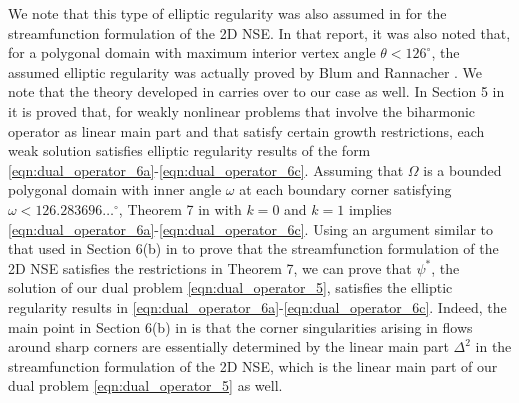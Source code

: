 \begin{remark}
  We note that this type of elliptic regularity was also assumed in \cite{Cayco86}
  for the streamfunction formulation of the 2D NSE.  In that report, it was also
  noted that, for a polygonal domain with maximum interior vertex angle $\theta <
  126^{\circ}$, the assumed elliptic regularity was actually proved by Blum and
  Rannacher \cite{Blum1980}.  We note that the theory developed in
  \cite{Blum1980} carries over to our case as well.  In Section 5 in
  \cite{Blum1980} it is proved that, for weakly nonlinear problems that
  involve the biharmonic operator as linear main part and that satisfy certain
  growth restrictions, each weak solution satisfies elliptic regularity results of
  the form \eqref{eqn:dual_operator_6a}-\eqref{eqn:dual_operator_6c}.  Assuming
  that $\Omega$ is a bounded polygonal domain with inner angle $\omega$ at each
  boundary corner satisfying $\omega < 126.283696\ldots^{\circ}$, Theorem 7 in
  \cite{Blum1980} with $k = 0$ and $k = 1$ implies
  \eqref{eqn:dual_operator_6a}-\eqref{eqn:dual_operator_6c}.  Using an argument
  similar to that used in Section 6(b) in \cite{Blum1980} to prove that
  the streamfunction formulation of the 2D NSE satisfies the restrictions in
  Theorem 7, we can prove that $\psi^*$, the solution of our dual problem
  \eqref{eqn:dual_operator_5}, satisfies the elliptic regularity results in
  \eqref{eqn:dual_operator_6a}-\eqref{eqn:dual_operator_6c}.  Indeed, the main
  point in Section 6(b) in \cite{Blum1980} is that the corner
  singularities arising in flows around sharp corners are essentially determined
  by the linear main part $\Delta^2$ in the streamfunction formulation of the 2D
  NSE, which is the linear main part of our dual problem
  \eqref{eqn:dual_operator_5} as well.
\end{remark}

